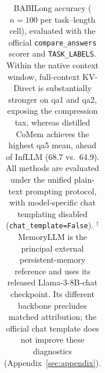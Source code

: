 \begin{table}[!htbp]
{\begin{tabular}{@{}llrrrrrrrr@{}}
\bottomrule
\end{tabular}%
}
\caption{BABILong accuracy ($n{=}100$ per task--length cell), evaluated with
the official \texttt{compare\_answers} scorer and \texttt{TASK\_LABELS}.
Within the native context window, full-context KV-Direct is substantially
stronger on qa1 and qa2, exposing the compression tax, whereas distilled CoMem
achieves the highest qa5 mean, ahead of InfLLM (68.7 vs.\ 64.9).
All methods are evaluated under the unified plain-text prompting protocol,
with model-specific chat templating disabled
(\texttt{chat\_template=False}).
$^{\dagger}$MemoryLLM is the principal external persistent-memory reference and
uses its released Llama-3-8B-chat checkpoint. Its different backbone precludes
matched attribution; the official chat template does not improve these
diagnostics (Appendix~\ref{sec:appendix}).}
\label{tab:babilong}
\end{table}